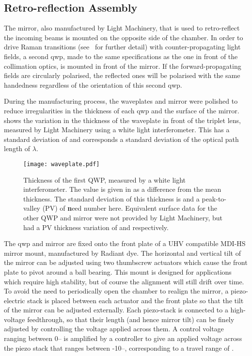 \subsection{Retro-reflection Assembly}\label{subsec:setup_ramanmirror}
The mirror, also manufactured by Light Machinery, that is used to retro-reflect the incoming beams is mounted on the opposite side of the chamber. In order to drive Raman transitions (see~ for further detail) with counter-propagating light fields, a second \ac{qwp}, made to the same specifications as the one in front of the collimation optics, is mounted in front of the mirror. If the forward-propagating fields are circularly polarised, the reflected ones will be polarised with the same handedness regardless of the orientation of this second \ac{qwp}. \par\noindent
During the manufacturing process, the waveplates and mirror were polished to reduce irregularities in the thickness of each \ac{qwp} and the surface of the mirror.  shows the variation in the thickness of the waveplate in front of the triplet lens, measured by Light Machinery using a white light interferometer. This has a standard deviation of  and corresponds a standard deviation of the optical path length of \(\lambda\). 
\begin{figure}
    \centering
    \texttt{[image: waveplate.pdf]}
    \caption{Thickness of the first \ac{QWP}, measured by a white light interferometer. The value is given in \sivalue{}{\nano\metre} as a difference from the mean thickness. The standard deviation of this thickness is  and a peak-to-valley (PV) of {\textbf need number here}. Equivalent surface data for the other \ac{QWP} and mirror were not provided by Light Machinery, but had a PV thickness variation of  and  respectively.}
    \label{fig:waveplate_map}
\end{figure}
\par\noindent
The \ac{qwp} and mirror are fixed onto the front plate of a UHV compatible MDI-HS mirror mount, manufactured by Radiant dye. The horizontal and vertical tilt of the mirror can be adjusted using two thumbscrew actuators which cause the front plate to pivot around a ball bearing. This mount is designed for applications which require high stability, but of course the alignment will still drift over time. To avoid the need to periodically open the chamber to realign the mirror, a piezo-electric stack is placed between each actuator and the front plate so that the tilt of the mirror can be adjusted externally. Each piezo-stack is connected to a high-voltage feedthrough, so that their length (and hence mirror tilt) can be finely adjusted by controlling the voltage applied across them. A control voltage ranging between 0-- is amplified by a controller to give an applied voltage across the piezo stack that ranges between -10--, corresponding to a travel range of .
